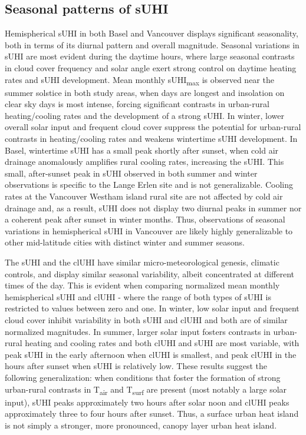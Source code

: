 \begin{bibunit}
\subsection{Seasonal patterns of sUHI}

Hemispherical sUHI in both Basel and Vancouver displays significant seasonality, both in terms of its diurnal pattern and overall magnitude. Seasonal variations in sUHI are most evident during the daytime hours, where large seasonal contrasts in cloud cover frequency and solar angle exert strong control on daytime heating rates and sUHI development. Mean monthly sUHI\textsubscript{max} is observed near the summer solstice in both study areas, when days are longest and insolation on clear sky days is most intense, forcing significant contrasts in urban-rural heating/cooling rates and the development of a strong sUHI. In winter, lower overall solar input and frequent cloud cover suppress the potential for urban-rural contrasts in heating/cooling rates and weakens wintertime sUHI development. In Basel, wintertime sUHI has a small peak shortly after sunset, when cold air drainage anomalously amplifies rural cooling rates, increasing the sUHI. This small, after-sunset peak in sUHI observed in both summer and winter observations is specific to the Lange Erlen site and is not generalizable. Cooling rates at the Vancouver Westham island rural site are not affected by cold air drainage and, as a result, sUHI does not display two diurnal peaks in summer nor a coherent peak after sunset in winter months. Thus, observations of seasonal variations in hemispherical sUHI in Vancouver are likely highly generalizable to other mid-latitude cities with distinct winter and summer seasons. 

The sUHI and the clUHI have similar micro-meteorological genesis, climatic controls, and display similar seasonal variability, albeit concentrated at different times of the day. This is evident when comparing normalized mean monthly hemispherical sUHI and clUHI - where the range of both types of sUHI is restricted to values between zero and one. In winter, low solar input and frequent cloud cover inhibit variability in both sUHI and clUHI and both are of similar normalized magnitudes. In summer, larger solar input fosters contrasts in urban-rural heating and cooling rates and both clUHI and sUHI are most variable, with peak sUHI in the early afternoon when clUHI is smallest, and peak clUHI in the hours after sunset when sUHI is relatively low. These results suggest the following generalization: when conditions that foster the formation of strong urban-rural contrasts in T\textsubscript{air} and T\textsubscript{surf} are present (most notably a large solar input), sUHI peaks approximately two hours after solar noon and clUHI peaks approximately three to four hours after sunset. Thus, a surface urban heat island is not simply a stronger, more pronounced, canopy layer urban heat island. 


\end{bibunit}
